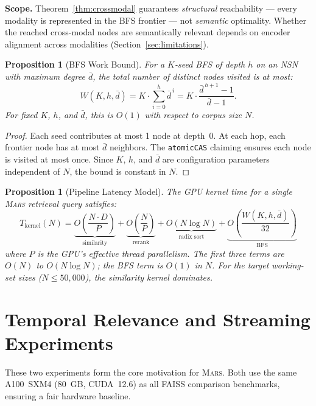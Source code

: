 \documentclass[11pt]{article}
\newtheorem{proposition}[theorem]{Proposition}
\newcommand{\mars}{\textsc{Mars}}
\begin{document}
\noindent\textbf{Scope.} Theorem~\ref{thm:crossmodal} guarantees
\emph{structural} reachability --- every modality is represented in the
BFS frontier --- not \emph{semantic} optimality. Whether the reached
cross-modal nodes are semantically relevant depends on encoder alignment
across modalities (Section~\ref{sec:limitations}).

\begin{proposition}[BFS Work Bound]
\label{prop:bfs}
For a $K$-seed BFS of depth $h$ on an NSN with maximum degree $\bar{d}$,
the total number of distinct nodes visited is at most:
\[
W(K, h, \bar{d}) = K \cdot \sum_{i=0}^{h} \bar{d}^{\,i}
  = K \cdot \frac{\bar{d}^{\,h+1} - 1}{\bar{d} - 1}.
\]
For fixed $K$, $h$, and $\bar{d}$, this is $O(1)$ with respect to
corpus size $N$.
\end{proposition}

\begin{proof}
Each seed contributes at most 1 node at depth~0. At each hop, each
frontier node has at most $\bar{d}$ neighbors. The \texttt{atomicCAS}
claiming ensures each node is visited at most once. Since $K$, $h$, and
$\bar{d}$ are configuration parameters independent of $N$, the bound is
constant in $N$.
\end{proof}

\begin{proposition}[Pipeline Latency Model]
\label{prop:latency}
The GPU kernel time for a single \mars{} retrieval query satisfies:
\[
T_{\mathrm{kernel}}(N) =
  \underbrace{O\!\left(\frac{N \cdot D}{P}\right)}_{\text{similarity}}
  + \underbrace{O\!\left(\frac{N}{P}\right)}_{\text{rerank}}
  + \underbrace{O(N \log N)}_{\text{radix sort}}
  + \underbrace{O\!\left(\frac{W(K,h,\bar{d})}{32}\right)}_{\text{BFS}}
\]
where $P$ is the GPU's effective thread parallelism. The first three
terms are $O(N)$ to $O(N \log N)$; the BFS term is $O(1)$ in $N$. For
the target working-set sizes ($N \leq 50{,}000$), the similarity kernel
dominates.
\end{proposition}

\section{Temporal Relevance and Streaming Experiments}
\label{sec:temporal}

These two experiments form the core motivation for \mars{}. Both use the
same A100~SXM4 (80~GB, CUDA~12.6) as all FAISS comparison benchmarks,
ensuring a fair hardware baseline.
\end{document}
